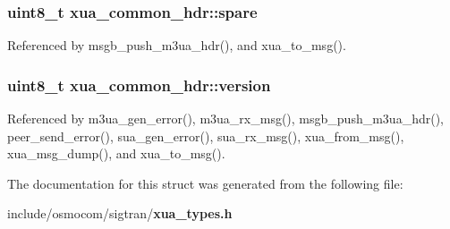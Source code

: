 \subsubsection[{spare}]{\setlength{\rightskip}{0pt plus 5cm}uint8\+\_\+t xua\+\_\+common\+\_\+hdr\+::spare}\label{structxua__common__hdr_a97d65c9177a7fec19bb04ccb84503ad8}


Referenced by msgb\+\_\+push\+\_\+m3ua\+\_\+hdr(), and xua\+\_\+to\+\_\+msg().

\subsubsection[{version}]{\setlength{\rightskip}{0pt plus 5cm}uint8\+\_\+t xua\+\_\+common\+\_\+hdr\+::version}\label{structxua__common__hdr_ada0be834eb42fecb964b6383980b1d6d}


Referenced by m3ua\+\_\+gen\+\_\+error(), m3ua\+\_\+rx\+\_\+msg(), msgb\+\_\+push\+\_\+m3ua\+\_\+hdr(), peer\+\_\+send\+\_\+error(), sua\+\_\+gen\+\_\+error(), sua\+\_\+rx\+\_\+msg(), xua\+\_\+from\+\_\+msg(), xua\+\_\+msg\+\_\+dump(), and xua\+\_\+to\+\_\+msg().



The documentation for this struct was generated from the following file\+:\begin{DoxyCompactItemize}
\item 
include/osmocom/sigtran/{\bf xua\+\_\+types.\+h}\end{DoxyCompactItemize}
